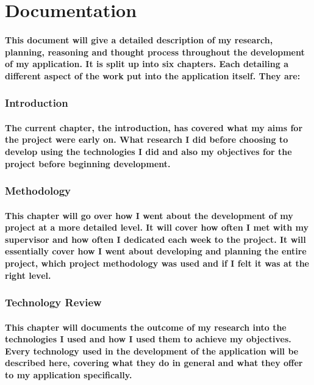 \section{Documentation}
\paragraph{This document will give a detailed description of my research, planning, reasoning and thought process throughout the development of my application. It is split up into six chapters. Each detailing a different aspect of the work put into the application itself. They are: }
    \subsubsection{Introduction}
    \paragraph{The current chapter, the introduction, has covered what my aims for the project were early on. What research I did before choosing to develop using the technologies I did and also my objectives for the project before beginning development.}
    \subsubsection{Methodology}
    \paragraph{This chapter will go over how I went about the development of my project at a more detailed level. It will cover how often I met with my supervisor and how often I dedicated each week to the project. It will essentially cover how I went about developing and planning the entire project, which project methodology was used and if I felt it was at the right level. }
    \subsubsection{Technology Review}
    \paragraph{This chapter will documents the outcome of my research into the technologies I used and how I used them to achieve my objectives. Every technology used in the development of the application will be described here, covering what they do in general and what they offer to my application specifically.}
